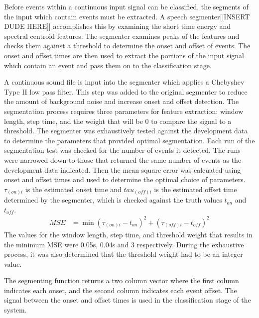 Before events within a continuous input signal can be classified, the segments of the input which contain events must be extracted. A speech segmenter[[INSERT DUDE HERE]] accomplishes this by examining the short time energy and spectral centroid features.  The segmenter examines peaks of the features and checks them against a threshold to determine the onset and offset of events. The onset and offset times are then used to extract the portions of the input signal which contain an event and pass them on to the classification stage. 

A continuous sound file is input into the segmenter which  applies a Chebyshev Type II low pass filter. This step was added to the original segmenter to reduce the amount of background noise and increase onset and offset detection. The segmentation process requires three parameters for feature extraction: window length, step time, and the weight that will be 0 to compare the signal to a threshold. The segmenter was exhaustively tested against the development data to determine the parameters that provided optimal segmentation. Each run of the segmentation test was checked for the number of events it detected. The runs were narrowed down to those that returned the same number of events as the development data indicated. Then the mean square error was calcuated using onset and offset times and used to determine the optimal choice of parameters.$\tau_{(on)i}$ is the estimated onset time and $tau_{(off)i}$ is the estimated offset time determined by the segmenter, which is checked against the truth values $t_{on}$ and $t_{off}$.
\begin{align}
{MSE} &=\min{ (\tau_{(on)i}-t_{on} )^2 + (\tau_{(off)i}-t_{off})^2  }
\end{align}
The values for the window length, step time, and threshold weight that results in the minimum MSE were 0.05s, 0.04s and 3 respectively. During the exhaustive process, it was also determined that the threshold weight had to be an integer value. 

The segmenting function returns a two column vector where the first column indicates each onset, and the second column indicates each event offset. The signal between the onset and offset times is used in the classification stage of the system. 